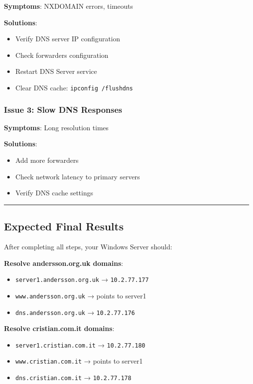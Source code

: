 \textbf{Symptoms}: NXDOMAIN errors, timeouts

\textbf{Solutions}:
\begin{itemize}
\tightlist
\item
  Verify DNS server IP configuration
\item
  Check forwarders configuration
\item
  Restart DNS Server service
\item
  Clear DNS cache: \texttt{ipconfig /flushdns}
\end{itemize}

\subsubsection{Issue 3: Slow DNS Responses}\label{issue-3-slow-dns-responses}

\textbf{Symptoms}: Long resolution times

\textbf{Solutions}:
\begin{itemize}
\tightlist
\item
  Add more forwarders
\item
  Check network latency to primary servers
\item
  Verify DNS cache settings
\end{itemize}

\begin{center}\rule{0.5\linewidth}{0.5pt}\end{center}

\subsection{Expected Final Results}\label{expected-final-results}

After completing all steps, your Windows Server should:

\textbf{Resolve andersson.org.uk domains}:
\begin{itemize}
\tightlist
\item
  \texttt{server1.andersson.org.uk} → \texttt{10.2.77.177}
\item
  \texttt{www.andersson.org.uk} → points to server1
\item
  \texttt{dns.andersson.org.uk} → \texttt{10.2.77.176}
\end{itemize}

\textbf{Resolve cristian.com.it domains}:
\begin{itemize}
\tightlist
\item
  \texttt{server1.cristian.com.it} → \texttt{10.2.77.180}
\item
  \texttt{www.cristian.com.it} → points to server1
\item
  \texttt{dns.cristian.com.it} → \texttt{10.2.77.178}
\end{itemize}

